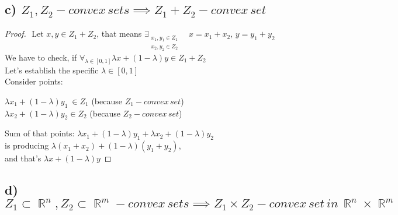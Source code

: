 \documentclass[12pt]{article}
\DeclareMathOperator{\R}{\mathbb{R}}
\begin{document}
\subsection*{c) \( Z_1, Z_2 - convex\,sets \implies Z_1+Z_2-convex\,set\)}
\begin{proof}
    $ $\newline
    Let \(x, y\in Z_1+Z_2\), that means \(\exists_{\substack{x_1, y_1 \in Z_1\\x_2,y_2 \in Z_2}}\quad x=x_1+x_2,\,y=y_1+y_2\) \\
    We have to check, if \(\forall_{\lambda \in [0,1]} \lambda x+(1-\lambda)y \in Z_1+Z_2\)\\
    Let's establish the specific \(\lambda \in [0,1]\)\\
    Consider points:
    \begin{center}
        \(\lambda x_1+(1-\lambda) y_1\ \in Z_1\) (because \(Z_1 - convex\,set\))\\
        \(\lambda x_2+(1-\lambda)y_2 \in Z_2\) (because \(Z_2 - convex\,set\))
    \end{center}
    Sum of that points: \(\lambda x_1+(1-\lambda) y_1 + \lambda x_2+(1-\lambda)y_2\)\\
    is producing \(\lambda (x_1+x_2)+(1-\lambda)(y_1+y_2)\),\\
    and that's \(\lambda x+(1-\lambda)y\)
\end{proof}
\newpage
\subsection*{d) \(Z_1 \subset \R^n, Z_2 \subset \R^m - convex\,sets \implies Z_1 \times Z_2 - convex\,set\,in\, \R^n \times \R^m\)}
\end{document}
